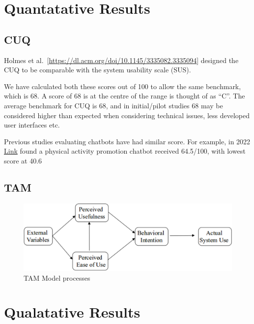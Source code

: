\documentclass[a4paper, nobind]{templates/ociamthesis}
\begin{document}
\hypertarget{quantatative-results}{%
\section{Quantatative Results}\label{quantatative-results}}

\hypertarget{cuq}{%
\subsection{CUQ}\label{cuq}}

Holmes et al.~{[}\url{https://dl.acm.org/doi/10.1145/3335082.3335094}{]} designed the CUQ to be comparable with the system usability scale (SUS).

We have calculated both these scores out of 100 to allow the same benchmark, which is 68.
A score of 68 is at the centre of the range is thought of as ``C''.
The average benchmark for CUQ is 68, and in initial/pilot studies 68 may be considered higher than expected when considering technical issues, less developed user interfaces etc.

Previous studies evaluating chatbots have had similar score.
For example, in 2022 \href{a\%3C\%20href=}{Link} found a physical activity promotion chatbot received 64.5/100, with lowest score at 40.6

\hypertarget{tam}{%
\subsection{TAM}\label{tam}}

\begin{figure}

{\centering \includegraphics[width=0.75\linewidth]{tam1} 

}

\caption{TAM Model processes}\label{fig:tam}
\end{figure}

\hypertarget{qualatative-results}{%
\section{Qualatative Results}\label{qualatative-results}}
\end{document}
